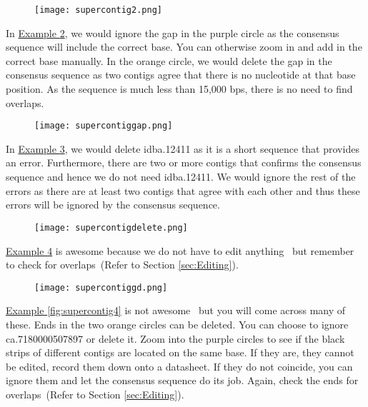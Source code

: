 \documentclass[11pt]{article}
\newcommand{\exautoref}[1]{\hyperref[#1]{Example \ref*{#1}}}
\newcommand{\secref}[1]{(Refer to Section \ref{#1})}
\begin{document}
\begin{figure}[H]
  \centering
    \texttt{[image: supercontig2.png]}
  \label{fig:supercontig2}
\end{figure}


In \exautoref{fig:supercontiggap}, we would ignore the gap in the purple circle as the consensus sequence will include the correct base. You can otherwise zoom in and add in the correct base manually. In the orange circle, we would delete the gap in the consensus sequence as two contigs agree that there is no nucleotide at that base position. As the sequence is much less than 15,000 bps, there is no need to find overlaps. 

\begin{figure}[H]
  \centering
    \texttt{[image: supercontiggap.png]}
  \label{fig:supercontiggap}
\end{figure}

In \exautoref{fig:supercontigdelete}, we would delete idba.12411 as it is a short sequence that provides an error. Furthermore, there are two or more contigs that confirms the consensus sequence and hence we do not need idba.12411. We would ignore the rest of the errors as there are at least two contigs that agree with each other and thus these errors will be ignored by the consensus sequence.

\begin{figure}[H]
  \centering
    \texttt{[image: supercontigdelete.png]}
  \label{fig:supercontigdelete}
\end{figure}

\exautoref{fig:supercontiggd} is awesome because we do not have to edit anything \smiley~but remember to check for overlaps~\secref{sec:Editing}.

\begin{figure}[H]
  \centering
    \texttt{[image: supercontiggd.png]}
  \label{fig:supercontiggd}
\end{figure}

\exautoref{fig:supercontig4} is not awesome \frownie~but you will come across many of these. Ends in the two orange circles can be deleted. You can choose to ignore ca.7180000507897 or delete it. Zoom into the purple circles to see if the black strips of different contigs are located on the same base. If they are, they cannot be edited, record them down onto a datasheet. If they do not coincide, you can ignore them and let the consensus sequence do its job. Again, check the ends for overlaps~\secref{sec:Editing}. 
\end{document}
